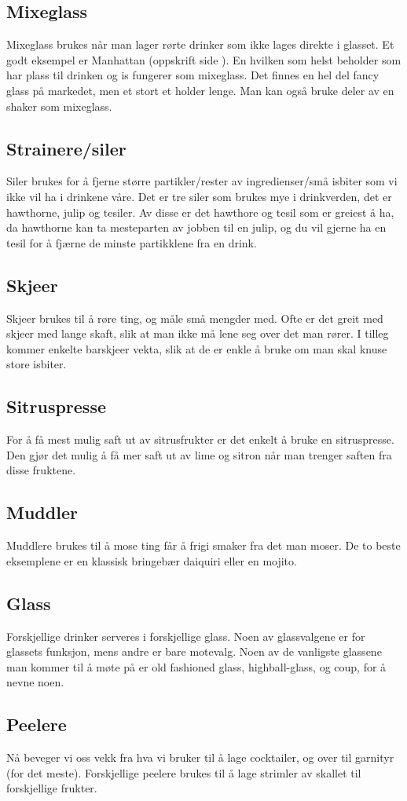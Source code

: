 \subsection{Mixeglass}
Mixeglass brukes når man lager rørte drinker som ikke lages direkte i glasset. Et godt eksempel er Manhattan (oppskrift side \pageref{drink:manhattan}). En hvilken som helst beholder som har plass til drinken og is fungerer som mixeglass. Det finnes en hel del fancy glass på markedet, men et stort et holder lenge. Man kan også bruke deler av en shaker som mixeglass.

\subsection{Strainere/siler}
Siler brukes for å fjerne større partikler/rester av ingredienser/små isbiter som vi ikke vil ha i drinkene våre. Det er tre siler som brukes mye i drinkverden, det er hawthorne, julip og tesiler. Av disse er det hawthore og tesil som er greiest å ha, da hawthorne kan ta mesteparten av jobben til en julip, og du vil gjerne ha en tesil for å fjærne de minste partikklene fra en drink.

\subsection{Skjeer}
Skjeer brukes til å røre ting, og måle små mengder med. Ofte er det greit med skjeer med lange skaft, slik at man ikke må lene seg over det man rører. I tilleg kommer enkelte barskjeer vekta, slik at de er enkle å bruke om man skal knuse store isbiter. 

\subsection{Sitruspresse}
For å få mest mulig saft ut av sitrusfrukter er det enkelt å bruke en sitruspresse. Den gjør det mulig å få mer saft ut av lime og sitron når man trenger saften fra disse fruktene.

\subsection{Muddler}
Muddlere brukes til å mose ting får å frigi smaker fra det man moser. De to beste eksemplene er en klassisk bringebær daiquiri eller en mojito.

\subsection{Glass}
Forskjellige drinker serveres i forskjellige glass. Noen av glassvalgene er for glassets funksjon, mens andre er bare motevalg. Noen av de vanligste glassene man kommer til å møte på er old fashioned glass, highball-glass, og coup, for å nevne noen.

\subsection{Peelere}
Nå beveger vi oss vekk fra hva vi bruker til å lage cocktailer, og over til garnityr (for det meste). Forskjellige peelere brukes til å lage strimler av skallet til forskjellige frukter.
